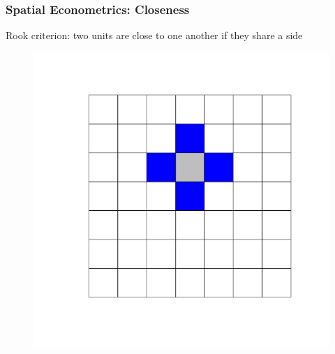 \documentclass[
  shownotes,
  xcolor={svgnames},
  hyperref={colorlinks,citecolor=DarkBlue,linkcolor=DarkRed,urlcolor=DarkBlue}
   , aspectratio=169]{beamer}
\begin{document}
\begin{frame}[fragile]
\frametitle{Spatial Econometrics: Closeness}

\bigskip

\begin{minipage}[t]{0.45\linewidth}
Rook criterion: two units are close to one another if they share a side
  \begin{figure}[H] \centering
    \captionsetup{justification=centering}
    \includegraphics[scale=0.3]{figures/rook.pdf}
   \end{figure}
  

\end{minipage}
\end{frame}
\end{document}
